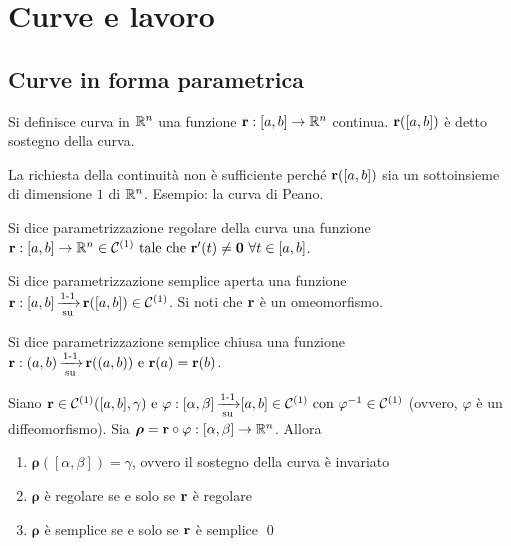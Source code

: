 \chapter{Curve e lavoro}\label{chap:curves}

\section{Curve in forma parametrica}

\begin{definition}
	[Curva]
	Si definisce curva in $\mathbb{R}^n$ una funzione $\vb{r}:[a,b]\to \mathbb{R}^n$ continua. $\vb{r}([a,b])$ è detto sostegno della curva.
\end{definition}

\begin{remark}
	La richiesta della continuità non è sufficiente perché $\vb{r}([a,b])$ sia un sottoinsieme di dimensione $1$ di $\mathbb{R}^n$. Esempio: la curva di Peano.
\end{remark}

\begin{definition}
	Si dice parametrizzazione regolare della curva una funzione $\vb{r}:[a,b]\to \mathbb{R}^n \in \mathcal{C}^{(1)} \text{ tale che } \vb{r}'(t)\neq\vb{0} \ \forall t \in [a,b]$.
\end{definition}

\begin{definition}
	Si dice parametrizzazione semplice aperta una funzione $\vb{r}: [a,b]\operatorname{\xrightarrow[\operatorname{su}]{\operatorname{1-1}}}\vb{r}([a,b]) \in \mathcal{C}^{(1)}$. Si noti che $\vb{r}$ è un omeomorfismo.
\end{definition}

\begin{definition}
	Si dice parametrizzazione semplice chiusa una funzione $\vb{r}: (a,b)\operatorname{\xrightarrow[\operatorname{su}]{\operatorname{1-1}}} \vb{r}((a,b)) \text{ e } \vb{r}(a)=\vb{r}(b)$.
\end{definition}

\begin{theorem}
	Siano $\vb{r} \in \mathcal{C}^{(1)}([a,b],\gamma) \text{ e } \varphi:[\alpha,\beta]\operatorname{\xrightarrow[\operatorname{su}]{\operatorname{1-1}}}[a,b]\\\in \mathcal{C}^{(1)} \text{ con } \varphi^{-1} \in \mathcal{C}^{(1)}$ (ovvero, $\varphi$ è un diffeomorfismo). Sia $\bm\rho = \vb{r} \circ \varphi: [\alpha, \beta] \to \mathbb{R}^n$. Allora
	\begin{enumerate}
		\item $\bm\rho([\alpha,\beta])=\gamma$, ovvero il sostegno della curva è invariato
		\item $\bm\rho$ è regolare se e solo se $\vb{r}$ è regolare
		\item $\bm\rho$ è semplice se e solo se $\vb{r}$ è semplice
		\qed
	\end{enumerate}
\end{theorem}

